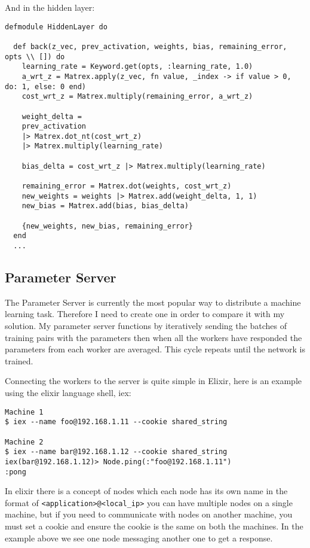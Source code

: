 And in the hidden layer:
\begin{lstlisting}[basicstyle=\linespread{0.8}\ttfamily\footnotesize]
defmodule HiddenLayer do

  def back(z_vec, prev_activation, weights, bias, remaining_error, opts \\ []) do
    learning_rate = Keyword.get(opts, :learning_rate, 1.0)
    a_wrt_z = Matrex.apply(z_vec, fn value, _index -> if value > 0, do: 1, else: 0 end)
    cost_wrt_z = Matrex.multiply(remaining_error, a_wrt_z)

    weight_delta =
    prev_activation
    |> Matrex.dot_nt(cost_wrt_z)
    |> Matrex.multiply(learning_rate)

    bias_delta = cost_wrt_z |> Matrex.multiply(learning_rate)

    remaining_error = Matrex.dot(weights, cost_wrt_z)
    new_weights = weights |> Matrex.add(weight_delta, 1, 1)
    new_bias = Matrex.add(bias, bias_delta)

    {new_weights, new_bias, remaining_error}
  end
  ...
\end{lstlisting}

\subsection{Parameter Server}
The Parameter Server is currently the most popular way to distribute a machine
learning task. Therefore I need to create one in order to compare it with my
solution. My parameter server functions by iteratively sending the batches of
training pairs with the parameters then when all the workers have responded the
parameters from each worker are averaged. This cycle repeats until the network
is trained.

Connecting the workers to the server is quite simple in Elixir, here is an
example using the elixir language shell, iex:
\begin{lstlisting}[basicstyle=\linespread{0.8}\ttfamily\footnotesize,numbers=none]
Machine 1
$ iex --name foo@192.168.1.11 --cookie shared_string

Machine 2
$ iex --name bar@192.168.1.12 --cookie shared_string
iex(bar@192.168.1.12)> Node.ping(:"foo@192.168.1.11")
:pong
\end{lstlisting}

In elixir there is a concept of nodes which each node has its own name in the
format of \lstinline{<application>@<local_ip>} you can have multiple nodes on a
single machine, but if you need to communicate with nodes on another machine,
you must set a cookie and ensure the cookie is the same on both the machines. In
the example above we see one node messaging another one to get a response.

